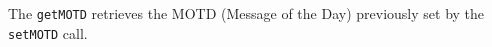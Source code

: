The \verb+getMOTD+ retrieves the MOTD (Message of the Day) previously set by the \verb+setMOTD+ call.
